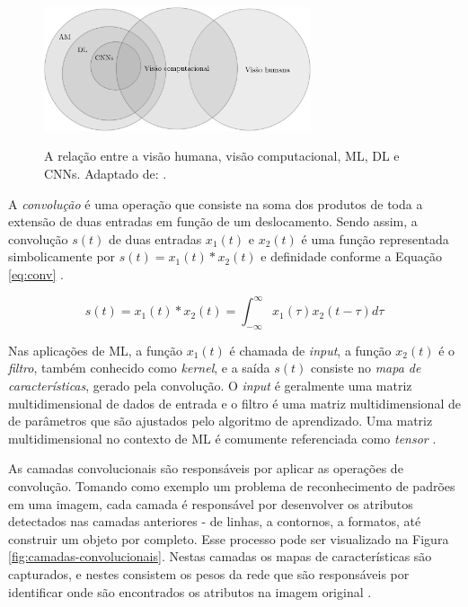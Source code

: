 \begin{figure}[h!]
  \centering
  \caption{A relação entre a visão humana, visão computacional, ML, DL e CNNs. Adaptado de: \cite{khan}.}
  \includegraphics[width=0.7\textwidth]{imgs/areas-ia}
  \label{fig:areas-ia}
\end{figure}

A \emph{convolução} é uma operação que consiste na soma dos produtos de toda a extensão de duas entradas em função de um deslocamento. Sendo assim, a convolução $s(t)$ de duas entradas $x_1(t)$ e $x_2(t)$ é uma função representada simbolicamente por $s(t) = x_1(t) * x_2(t)$ e definidade conforme a Equação \ref{eq:conv} \cite{lathi}.

\begin{equation}
  \label{eq:conv}
  s(t) = x_1(t) * x_2(t) = \int_{-\infty}^{\infty} x_1(\tau)x_2(t - \tau)d\tau
\end{equation}

Nas aplicações de ML, a função $x_1(t)$ é chamada de \emph{input}, a função $x_2(t)$ é o \emph{filtro}, também conhecido como \emph{kernel}, e a saída $s(t)$ consiste no \emph{mapa de características}, gerado pela convolução. O \emph{input} é geralmente uma matriz multidimensional de dados de entrada e o filtro é uma matriz multidimensional de de parâmetros que são ajustados pelo algoritmo de aprendizado. Uma matriz multidimensional no contexto de ML é comumente referenciada como \emph{tensor} \cite{goodfellow}.

As camadas convolucionais são responsáveis por aplicar as operações de convolução. Tomando como exemplo um problema de reconhecimento de padrões em uma imagem, cada camada é responsável por desenvolver os atributos detectados nas camadas anteriores - de linhas, a contornos, a formatos, até construir um objeto por completo. Esse processo pode ser visualizado na Figura \ref{fig:camadas-convolucionais}. Nestas camadas os mapas de características são capturados, e nestes consistem os pesos da rede que são responsáveis por identificar onde são encontrados os atributos na imagem original \cite{buduma}.

